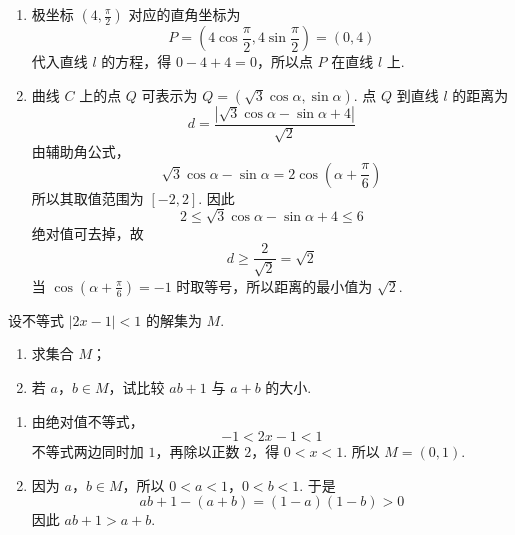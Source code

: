 \begin{solution}
\begin{enumerate}
\item 极坐标 \(\left(4,\frac{\pi}{2}\right)\) 对应的直角坐标为
\[
P=\left(4\cos\frac{\pi}{2},4\sin\frac{\pi}{2}\right)=(0,4)
\]
代入直线 \(l\) 的方程，得 \(0-4+4=0\)，所以点 \(P\) 在直线 \(l\) 上.

\item 曲线 \(C\) 上的点 \(Q\) 可表示为 \(Q=(\sqrt{3}\cos\alpha,\sin\alpha)\). 点 \(Q\) 到直线 \(l\) 的距离为
\[
d=\frac{|\sqrt{3}\cos\alpha-\sin\alpha+4|}{\sqrt{2}}
\]
由辅助角公式，
\[
\sqrt{3}\cos\alpha-\sin\alpha=2\cos\left(\alpha+\frac{\pi}{6}\right)
\]
所以其取值范围为 \([-2,2]\). 因此
\[
2\leqslant\sqrt{3}\cos\alpha-\sin\alpha+4\leqslant6
\]
绝对值可去掉，故
\[
d\geqslant\frac{2}{\sqrt{2}}=\sqrt{2}
\]
当 \(\cos\left(\alpha+\frac{\pi}{6}\right)=-1\) 时取等号，所以距离的最小值为 \(\sqrt{2}\).
\end{enumerate}
\end{solution}

\begin{problem}
设不等式 \(|2x-1|<1\) 的解集为 \(M\).

\begin{enumerate}
\item 求集合 \(M\)；
\item 若 \(a\)，\(b\in M\)，试比较 \(ab+1\) 与 \(a+b\) 的大小.
\end{enumerate}
\end{problem}

\begin{solution}
\begin{enumerate}
\item 由绝对值不等式，
\[
-1<2x-1<1
\]
不等式两边同时加 \(1\)，再除以正数 \(2\)，得 \(0<x<1\). 所以 \(M=(0,1)\).

\item 因为 \(a\)，\(b\in M\)，所以 \(0<a<1\)，\(0<b<1\). 于是
\[
ab+1-(a+b)=(1-a)(1-b)>0
\]
因此 \(ab+1>a+b\).
\end{enumerate}
\end{solution}
